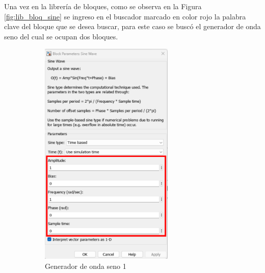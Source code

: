 Una vez en la librería de bloques, como se observa en la Figura \ref{fig:lib_bloq_sine} se ingreso en el buscador marcado en color rojo la palabra clave del bloque que se desea buscar, para este caso se buscó el generador de onda seno del cual se ocupan dos bloques. 

\begin{figure}[htbp]
    \centering
    \begin{subfigure}[b]{0.45\textwidth}
        \centering
        \includegraphics[width=0.7\textwidth]{fig/especifico_2/CASO_ESTUDIO_FILTRO/sinewave_1.pdf}
        \caption{Generador de onda seno 1}
        \label{fig:sine_gen_01}
    \end{subfigure}
    \hfill
    \begin{subfigure}[b]{0.45\textwidth}
        \centering

\end{subfigure}
\end{figure}
